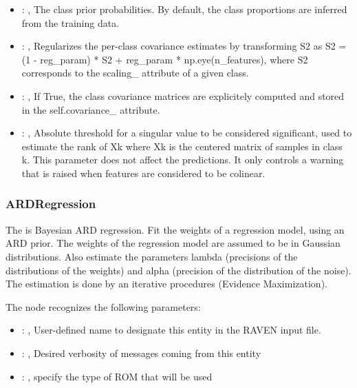 \begin{itemize}
    \item {}: , 
      The class prior probabilities. By default, the class
      proportions are inferred from the training data.

    \item {}: , 
      Regularizes the per-class covariance estimates by transforming
      S2 as S2 = (1 - reg\_param) * S2 + reg\_param * np.eye(n\_features),
      where S2 corresponds to the                                                  scaling\_
      attribute of a given class.

    \item {}: , 
      If True, the class covariance matrices are explicitely
      computed and stored in the self.covariance\_ attribute.

    \item {}: , 
      Absolute threshold for a singular value to be considered
      significant, used to estimate the rank of Xk where Xk is the centered
      matrix of samples in class k. This parameter does not affect
      the predictions. It only controls a warning that is raised when
      features are considered to be colinear.
  \end{itemize}


\subsubsection{ARDRegression}
  The  is Bayesian ARD regression.                             Fit the
  weights of a regression model, using an ARD prior. The weights of the
  regression model are assumed to be in Gaussian distributions. Also estimate the
  parameters lambda (precisions of the distributions of the weights) and
  alpha (precision of the distribution of the noise).                             The estimation is
  done by an iterative procedures (Evidence Maximization).

  The  node recognizes the following parameters:
    \begin{itemize}
      \item {}: , 
        User-defined name to designate this entity in the RAVEN input file.
      \item {}: , 
        Desired verbosity of messages coming from this entity
      \item {}: , 
        specify the type of ROM that will be used
  \end{itemize}

